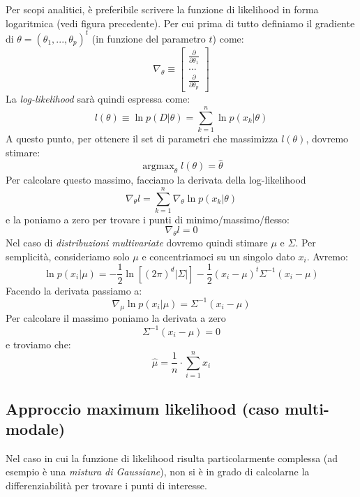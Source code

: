 \documentclass[a4paper,oneside,titlepage]{book}
\DeclareMathOperator*{\argmax}{\arg\max}
\begin{document}
\noindent
Per scopi analitici, è preferibile scrivere la funzione di likelihood in forma logaritmica (vedi figura precedente). Per cui prima di tutto definiamo il gradiente di $\theta = (\theta_1,...,\theta_p)^t$ (in funzione del parametro $t$) come:
\[ \nabla_{\theta} \equiv \left[ \substack{\frac{\partial}{\partial \theta_1} \\ \dots \\ \frac{\partial}{\partial \theta_p}} \right] \]
La \textit{log-likelihood} sarà quindi espressa come:
\[ l(\theta) \equiv \ln p(D|\theta) = \sum_{k=1}^n \ln p(x_k|\theta) \]
A questo punto, per ottenere il set di parametri che massimizza $l(\theta)$, dovremo stimare:
\[ \argmax_{\theta} l(\theta) = \hat{\theta} \]
Per calcolare questo massimo, facciamo la derivata della log-likelihood
\[ \nabla_{\theta} l = \sum_{k=1}^n \nabla_{\theta} \ln p(x_k|\theta) \]
e la poniamo a zero per trovare i punti di minimo/massimo/flesso:
\[ \nabla_{\theta} l = 0 \]
Nel caso di \textit{distribuzioni multivariate} dovremo quindi stimare $\mu$ e $\Sigma$. Per semplicità, consideriamo solo $\mu$ e concentriamoci su un singolo dato $x_i$. Avremo:
\[ \ln p(x_i|\mu) = - \frac{1}{2} \ln [(2\pi)^d |\Sigma|] - \frac{1}{2} (x_i - \mu)^t \Sigma^{-1} (x_i - \mu) \]
Facendo la derivata passiamo a:
\[ \nabla_{\mu} \ln p(x_i|\mu) = \Sigma^{-1} (x_i - \mu) \]
Per calcolare il massimo poniamo la derivata a zero
\[ \Sigma^{-1} (x_i - \mu) = 0 \]
e troviamo che:
\[ \hat{\mu} = \frac{1}{n} \cdot \sum_{i=1}^n x_i \]

\subsection{Approccio maximum likelihood (caso multi-modale)}
Nel caso in cui la funzione di likelihood risulta particolarmente complessa (ad esempio è una \textit{mistura di Gaussiane}), non si è in grado di calcolarne la differenziabilità per trovare i punti di interesse.
\end{document}
